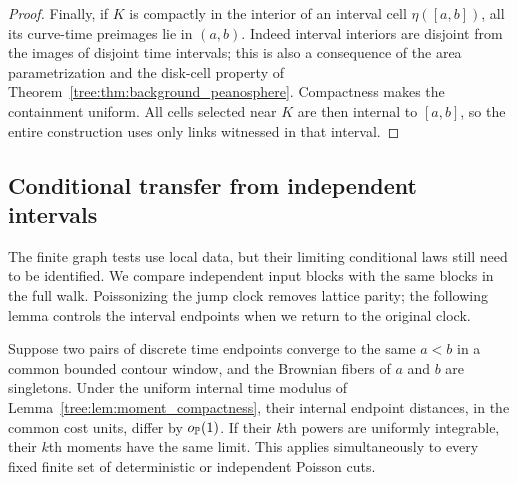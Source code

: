 \begin{proof}
Finally, if $K$ is compactly in the interior of an interval cell
$\eta([a,b])$, all its curve-time preimages lie in $(a,b)$.  Indeed
interval interiors are disjoint from the images of disjoint time
intervals; this is also a consequence of the area parametrization
and the disk-cell property of Theorem~\ref{tree:thm:background_peanosphere}.
Compactness makes the containment uniform.  All cells selected near
$K$ are then internal to $[a,b]$, so the entire construction uses only
links witnessed in that interval.
\end{proof}

\subsection{Conditional transfer from independent intervals}

The finite graph tests use local data, but their limiting conditional
laws still need to be identified. We compare independent input blocks
with the same blocks in the full walk. Poissonizing the jump clock
removes lattice parity; the following lemma controls the interval
endpoints when we return to the original clock.

\begin{lemma}\label{tree:lem:cut_stability}
Suppose two pairs of discrete time endpoints converge to the same
$a<b$ in a common bounded contour window, and the Brownian fibers
of $a$ and $b$ are singletons.  Under the uniform internal time
modulus of Lemma~\ref{tree:lem:moment_compactness}, their internal
endpoint distances, in the common cost units, differ by
$o_{\mathbb P}(1)$.  If their $k$th powers are uniformly integrable,
their $k$th moments have the same limit.  This applies simultaneously
to every fixed finite set of deterministic or independent Poisson cuts.
\end{lemma}


